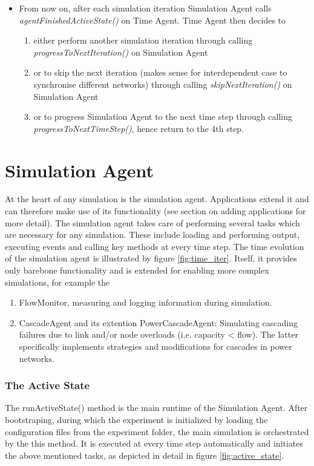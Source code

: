 \documentclass[11pt,fleqn]{book} %
\newcommand{\mainagent}{simulation agent}
\newcommand{\MainAgent}{Simulation Agent}
\newcommand{\TimeAgent}{Time Agent}
\newcommand{\CascadeAgent}{CascadeAgent}
\begin{document}
\begin{enumerate}
\begin{itemize}
		\item From now on, after each simulation iteration \MainAgent{} calls \textit{agentFinishedActiveState()} on \TimeAgent{}. \TimeAgent{} then decides to 
		\begin{enumerate}[label=(\alph*)]
			\item either perform another simulation iteration through calling \textit{progressToNextIteration()} on \MainAgent{}
			\item or to skip the next iteration (makes sense for interdependent case to synchronise different networks) through calling \textit{skipNextIteration()} on \MainAgent{}
			\item or to progress \MainAgent{} to the next time step through calling \textit{progressToNextTimeStep()}, hence return to the 4th step.
		\end{enumerate}  
	\end{itemize}
\end{enumerate}


\section{Simulation Agent}\label{sec:simu_agent}
At the heart of any simulation is the simulation agent. Applications extend it and can therefore make use of its functionality (see section on adding applications for more detail). The \mainagent{} takes care of performing several tasks which are necessary for any simulation. These include loading and performing output, executing events and calling key methods at every time step. The time evolution of the simulation agent is illustrated by figure \ref{fig:time_iter}. Itself, it provides only barebone functionality and is extended for enabling more complex simulations, for example the
	\begin{enumerate}
		\item FlowMonitor, measuring and logging information during simulation.
		\item \CascadeAgent{} and its extention Power\CascadeAgent{}: Simulating cascading failures due to link and/or node overloads (i.e. capacity < flow). The latter specifically implements strategies and modifications for cascades in power networks.
	\end{enumerate}

\subsubsection{The Active State}
The runActiveState() method is the main runtime of the \MainAgent{}. After bootstraping, during which the experiment is initialized by loading the configuration files from the experiment folder, the main simulation is orchestrated by the this method. It is executed at every time step automatically and initiates the above mentioned tasks, as depicted in detail in figure \ref{fig:active_state}.
\end{document}
